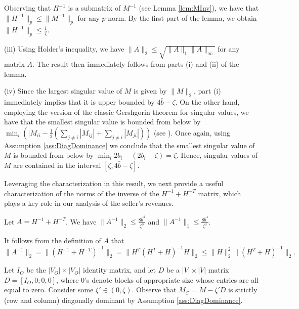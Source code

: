 \documentclass[opre,nonblindrev]{informs3} %
\begin{document}
\begin{APPENDIX}{}
 Observing that $H^{-1}$ is a submatrix of $M^{-1}$ (see Lemma \ref{lem:MInv}), we have that
 $\|H^{-1} \|_p \leq \| M^{-1} \|_p $ for any $p$-norm. By the first part of the lemma, we obtain $\|H^{-1} \|_p \leq \frac{1}{\zeta}$.
 
 (iii) Using Holder's inequality, we have $\|A\|_2 \leq \sqrt{\|A\|_1 \|A\|_\infty }$ for any matrix $A$. The result then immediately follows from parts (i) and (ii) of the lemma.
 
 
 (iv) Since the largest singular value of $M$ is given by $\|M\|_2$, part (i) immediately implies that
 it is upper bounded by $4\bar{b}-\zeta$.
 On the other hand, employing the version of the
 classic Gershgorin theorem for singular values, we have that
 the smallest singular value is bounded from below by
 $\min_i \left(|M_{ii} - \frac{1}{2} \left(\sum_{j\neq i} |M_{ij}| + \sum_{j\neq i} |M_{ji}| \right) \right)$
 (see \citet{johnson1989gersgorin}).
 Once again, using
 Assumption
 \ref{ass:DiagDominance}
 we conclude that the smallest singular value of $M$ is bounded from below by  $\min_i 2b_i-(2b_i-\zeta)=\zeta$. Hence, singular values of $M$ are contained in the interval  $[\zeta, 4\bar{b}-\zeta]$.
 \hfill \halmos
 \endproof	
 	
 	Leveraging the characterization in this result, we next provide a useful characterization of the norms of the inverse of the $H^{-1} + H^{-T}$ matrix, which plays a key role in our analysis of the seller's revenues.
 	
\begin{lemma}\label{lem:Ainv}
	Let $A	=H^{-1} + H^{-T}$. We have
	$\|A^{-1}\|_2\leq \frac{8 \bar{b}^4}{\zeta^3}$ and $\|A^{-1}\|_1\leq  \frac{8 \bar{b}^4}{\zeta^3}$.
\end{lemma}
\noindent{}
It follows from the definition of $A$ that
\begin{equation} \label{eq:AinvBound}
\|A^{-1}\|_2=
\|(H^{-1}+H^{-T})^{-1}\|_2=
\|H^T(H^{T}+H)^{-1}H\|_2
\leq \|H\|_2^2  \|(H^{T}+H)^{-1}\|_2.
\end{equation}

Let ${I_O}$ be the 
$|V_O|\times |V_O|$
identity matrix, and let $D$  be a $|V|\times|V|$ matrix
$D=[I_O, 0; 0, 0]$, where $0$'s denote blocks of appropriate size whose entries are all equal to zero.
Consider some $\zeta'\in (0,\zeta)$.
Observe that $M_{\zeta'}=M- {\zeta'} D $ is strictly (row and column) diagonally dominant by Assumption \ref{ass:DiagDominance}.



\end{APPENDIX}
\end{document}
